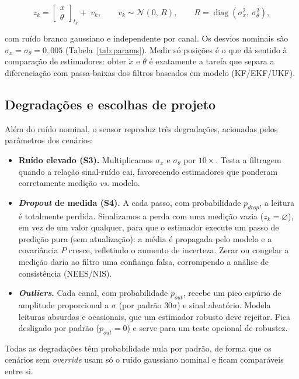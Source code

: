 \documentclass[brazil, 12pt]{article}
\begin{document}
\[
z_k =
\begin{bmatrix} x \\ \theta \end{bmatrix}_{t_k}
+\; v_k,
\qquad
v_k \sim \mathcal{N}(0,\,R),
\qquad
R = \operatorname{diag}\!\left(\sigma_x^{2},\ \sigma_\theta^{2}\right),
\]

com ruído branco gaussiano e independente por canal. Os desvios nominais são
$\sigma_x = \sigma_\theta = 0{,}005$ (Tabela~\ref{tab:params}). Medir só
posições é o que dá sentido à comparação de estimadores: obter $\dot{x}$ e
$\dot{\theta}$ é exatamente a tarefa que separa a diferenciação com
passa-baixas dos filtros baseados em modelo (KF/EKF/UKF).

\subsection{Degradações e escolhas de projeto}

Além do ruído nominal, o sensor reproduz três degradações, acionadas pelos
parâmetros dos cenários:

\begin{itemize}
  \item \textbf{Ruído elevado (S3).} Multiplicamos $\sigma_x$ e $\sigma_\theta$
  por $10\times$. Testa a filtragem quando a relação sinal-ruído cai,
  favorecendo estimadores que ponderam corretamente medição \emph{vs.} modelo.

  \item \textbf{\emph{Dropout} de medida (S4).} A cada passo, com probabilidade
  $p_{drop}$, a leitura é totalmente perdida. Sinalizamos a perda com uma
  medição vazia ($z_k=\varnothing$), em vez de um valor qualquer, para que o
  estimador execute um passo de predição pura (sem atualização): a média é
  propagada pelo modelo e a covariância $P$ cresce, refletindo o aumento de
  incerteza. Zerar ou congelar a medição daria ao filtro uma confiança falsa,
  corrompendo a análise de consistência (NEES/NIS).

  \item \textbf{\emph{Outliers}.} Cada canal, com probabilidade $p_{out}$,
  recebe um pico espúrio de amplitude proporcional a $\sigma$ (por padrão
  $30\sigma$) e sinal aleatório. Modela leituras absurdas e ocasionais, que um
  estimador robusto deve rejeitar. Fica desligado por padrão ($p_{out}=0$) e
  serve para um teste opcional de robustez.
\end{itemize}

Todas as degradações têm probabilidade nula por padrão, de forma que os
cenários sem \emph{override} usam só o ruído gaussiano nominal e ficam
comparáveis entre si.
\end{document}
